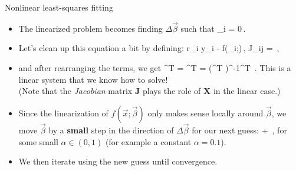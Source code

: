 \documentclass[10pt,aspectratio=169,handout]{beamer}
\begin{document}
\begin{frame}{Nonlinear least-squares fitting}
	\begin{itemize}[<+->]
		\item The linearized problem becomes finding $\Delta\vec{\beta}$ such that
		\bea
		\sum_i = 0\,.
		\eea
		\item Let's clean up this equation a bit by defining:
		\vspace{-0.2cm}
		\bea
			r_i \equiv  y_i - f(_i;\vec{\beta})\,, \quad J_{ij} = \,,
		\eea
		\vspace{-0.5cm}
		\item and after rearranging the terms, we get
		\bea
			\mathbf{J}^T \Delta\vec{\beta} = ^T \quad\longrightarrow \quad \Delta\vec{\beta} = (\mathbf{J}^T )^{-1}^T \,.
		\eea
		This is a linear system that we know how to solve! \smiley{}\\
		 (Note that the \textit{Jacobian} matrix $\mathbf{J}$ plays the role of $\mathbf{X}$ in the linear case.)
		\item Since the linearization of $f(\vec{x};\vec{\beta})$ only makes sense locally around $\vec{\beta}$, we move $\vec{\beta}$ by a \textbf{small} step in the direction of $\Delta\vec{\beta}$ for our next guess:
		\bea
			\vec{\beta} \leftarrow \vec{\beta} + \alpha \Delta\vec{\beta}\,,
		\eea
		for some small $\alpha\in(0,1)$ (for example a constant $\alpha=0.1$).
		\item We then iterate using the new guess until convergence.
	\end{itemize}

\end{frame}
\end{document}
